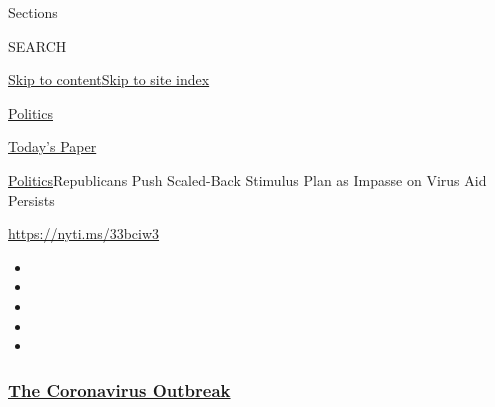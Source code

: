 Sections

SEARCH

\protect\hyperlink{site-content}{Skip to
content}\protect\hyperlink{site-index}{Skip to site index}

\href{https://www.nytimes3xbfgragh.onion/section/politics}{Politics}

\href{https://myaccount.nytimes3xbfgragh.onion/auth/login?response_type=cookie\&client_id=vi}{}

\href{https://www.nytimes3xbfgragh.onion/section/todayspaper}{Today's
Paper}

\href{/section/politics}{Politics}\textbar{}Republicans Push Scaled-Back
Stimulus Plan as Impasse on Virus Aid Persists

\url{https://nyti.ms/33bciw3}

\begin{itemize}
\item
\item
\item
\item
\item
\end{itemize}

\hypertarget{the-coronavirus-outbreak}{%
\subsubsection{\texorpdfstring{\href{https://www.nytimes3xbfgragh.onion/news-event/coronavirus?name=styln-coronavirus-national\&region=TOP_BANNER\&block=storyline_menu_recirc\&action=click\&pgtype=Article\&impression_id=f5bdbc40-f52c-11ea-a213-4b5d07e8d7c1\&variant=undefined}{The
Coronavirus
Outbreak}}{The Coronavirus Outbreak}}\label{the-coronavirus-outbreak}}

